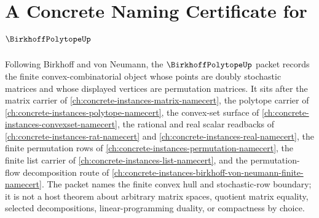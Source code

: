 \chapter{A Concrete Naming Certificate for $\BirkhoffPolytopeUp$}
\label{ch:concrete-instances-birkhoff-polytope-namecert}

Following Birkhoff and von Neumann, the $\BirkhoffPolytopeUp$ packet records the finite convex-combinatorial object whose points are doubly stochastic matrices and whose displayed vertices are permutation matrices. It sits after the matrix carrier of \autoref{ch:concrete-instances-matrix-namecert}, the polytope carrier of \autoref{ch:concrete-instances-polytope-namecert}, the convex-set surface of \autoref{ch:concrete-instances-convexset-namecert}, the rational and real scalar readbacks of \autoref{ch:concrete-instances-rat-namecert} and \autoref{ch:concrete-instances-real-namecert}, the finite permutation rows of \autoref{ch:concrete-instances-permutation-namecert}, the finite list carrier of \autoref{ch:concrete-instances-list-namecert}, and the permutation-flow decomposition route of \autoref{ch:concrete-instances-birkhoff-von-neumann-finite-namecert}. The packet names the finite convex hull and stochastic-row boundary; it is not a host theorem about arbitrary matrix spaces, quotient matrix equality, selected decompositions, linear-programming duality, or compactness by choice.

